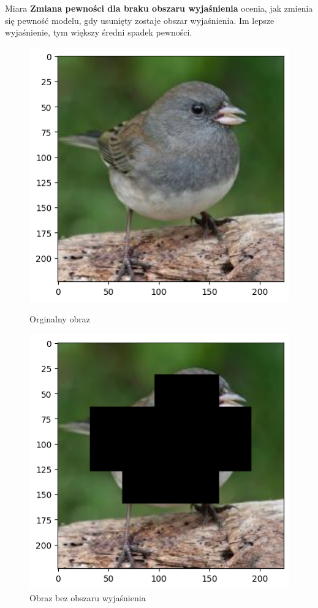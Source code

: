 Miara \textbf{Zmiana pewności dla braku obszaru wyjaśnienia} ocenia, jak zmienia się pewność modelu, gdy usunięty zostaje obszar wyjaśnienia.
Im lepsze wyjaśnienie, tym większy średni spadek pewności.

\begin{figure}
	\begin{minipage}[b]{0.45\textwidth}
		\centering\includegraphics[width=.9\textwidth]{img/parameters/quality/base}
		\caption{Orginalny obraz}  \label{rys:parameters_lime_numsamples_1000}
	\end{minipage}
	\begin{minipage}[b]{0.45\textwidth}
		\centering\includegraphics[width=.9\textwidth]{img/parameters/quality/wo_mask}
		\caption{Obraz bez obszaru wyjaśnienia}  \label{rys:parameters_lime_numsamples_1000}
	\end{minipage}
\end{figure}

